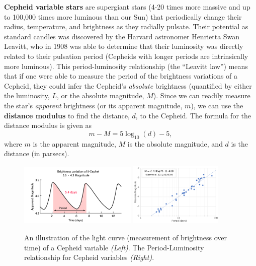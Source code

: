 \documentclass[11pt]{article}
\begin{document}
\textbf{Cepheid variable stars} are supergiant stars (4-20 times more massive and up to 100,000 times more luminous than our Sun) that periodically change their radius, temperature, and brightness as they radially pulsate. Their potential as standard candles was discovered by the Harvard astronomer Henrietta Swan Leavitt, who in 1908 was able to determine that their luminosity was directly related to their pulsation period (Cepheids with longer periods are intrinsically more luminous). This period-luminosity relationship (the ``Leavitt law'') means that if one were able to measure the period of the brightness variations of a Cepheid, they could infer the Cepheid's \emph{absolute} brightness (quantified by either the luminosity, $L$, or the absolute magnitude, $M$). Since we can readily measure the star's \emph{apparent} brightness (or its apparent magnitude, $m$), we can use the \textbf{distance modulus} to find the distance, $d$, to the Cepheid. The formula for the distance modulus is given as
\begin{equation} \label{eq:dm}
    m - M = 5\log_{10}(d)-5,
\end{equation}
where $m$ is the apparent magnitude, $M$ is the absolute magnitude, and $d$ is the distance (in parsecs).

\begin{figure}[h]
    \centering
    \includegraphics[width=0.5\textwidth]{cephd.png}
    \includegraphics[width=0.40\textwidth]{2560px-Storm2011_Cepheid_Data.svg.png}
    \caption{An illustration of the light curve (measurement of brightness over time) of a Cepheid variable \textsl{(Left)}. The Period-Luminosity relationship for Cepheid variables \textsl{(Right)}.}
    \label{fig:cepheid_periodlum_relationship}
\end{figure}
\end{document}
